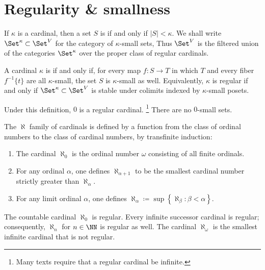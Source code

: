 
\section{Regularity \& smallness}%
\label{sec:regularityandsmallness}

\begin{definition}
	If $ \kappa $ is a cardinal,
	then a set $ S $ is 
	if and only if $ |S| < \kappa $.
	We shall write $ \Set^{\kappa} \subset \Set^V$
	for the category of $ \kappa $-small sets,
	Thus $ \Set^V $ is the filtered union of the categories $ \Set^{\kappa} $
	over the proper class of regular cardinals.
	
	A cardinal $ \kappa $ is 
	if and only if, for every map $ f \colon S \to T $
	in which $ T $ and every fiber $ f^{-1}\{t\} $ are all $ \kappa $-small,
	the set $ S $ is $ \kappa $-small as well.
	Equivalently, $ \kappa $ is regular if and only if
	$ \Set^{\kappa} \subset \Set^V $ is stable under colimits indexed by $ \kappa $-small posets.
\end{definition}

\begin{eg}
	Under this definition, $ 0 $ is a regular cardinal.%
	\footnote{Many texts require that a regular cardinal be infinite.}
	There are no $ 0 $-small sets.
\end{eg}

\begin{eg}
	The $ \aleph $ family of cardinals is defined by
	a function from the class of ordinal numbers
	to the class of cardinal numbers, by transfinite induction:
	\begin{enumerate}
		\item The cardinal $ \aleph_0 $ is the ordinal number
			$ \omega $ consisting of all finite ordinals.
		\item For any ordinal $ \alpha $,
			one defines $ \aleph_{\alpha + 1} $ to be
			the smallest cardinal number strictly greater than $ \aleph_{\alpha} $.
		\item For any limit ordinal $ \alpha $,
			one defines $ \aleph_{\alpha} \coloneq \sup \left\{ \aleph_{\beta} : \beta < \alpha \right\} $.
	\end{enumerate}

	The countable cardinal $ \aleph_0 $ is regular.
	Every infinite successor cardinal is regular;
	consequently, $ \aleph_n $ for $ n \in \NN $ is regular as well.
	The cardinal $ \aleph_{\omega} $ is
	the smallest infinite cardinal that is not regular.
\end{eg}

